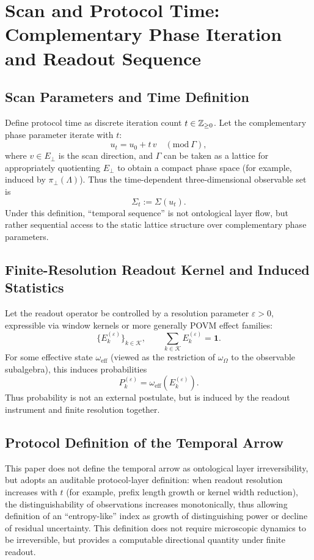 \section{Scan and Protocol Time: Complementary Phase Iteration and Readout Sequence}

\subsection{Scan Parameters and Time Definition}

Define protocol time as discrete iteration count $t\in\mathbb{Z}_{\ge 0}$. Let the complementary phase parameter iterate with $t$:
\[
u_t=u_{0}+t\,v\quad (\mathrm{mod}\ \Gamma),
\]
where $v\in E_{\perp}$ is the scan direction, and $\Gamma$ can be taken as a lattice for appropriately quotienting $E_{\perp}$ to obtain a compact phase space (for example, induced by $\pi_{\perp}(\Lambda)$). Thus the time-dependent three-dimensional observable set is
\[
\Sigma_t := \Sigma(u_t).
\]
Under this definition, ``temporal sequence'' is not ontological layer flow, but rather sequential access to the static lattice structure over complementary phase parameters.

\subsection{Finite-Resolution Readout Kernel and Induced Statistics}

Let the readout operator be controlled by a resolution parameter $\varepsilon>0$, expressible via window kernels or more generally POVM effect families:
\[
\big\{E_k^{(\varepsilon)}\big\}_{k\in \mathcal{K}},\qquad \sum_{k\in\mathcal{K}}E_k^{(\varepsilon)}=\mathbf{1}.
\]
For some effective state $\omega_{\mathrm{eff}}$ (viewed as the restriction of $\omega_\Omega$ to the observable subalgebra), this induces probabilities
\[
P_k^{(\varepsilon)}=\omega_{\mathrm{eff}}\!\left(E_k^{(\varepsilon)}\right).
\]
Thus probability is not an external postulate, but is induced by the readout instrument and finite resolution together.

\subsection{Protocol Definition of the Temporal Arrow}

This paper does not define the temporal arrow as ontological layer irreversibility, but adopts an auditable protocol-layer definition: when readout resolution increases with $t$ (for example, prefix length growth or kernel width reduction), the distinguishability of observations increases monotonically, thus allowing definition of an ``entropy-like'' index as growth of distinguishing power or decline of residual uncertainty. This definition does not require microscopic dynamics to be irreversible, but provides a computable directional quantity under finite readout.
